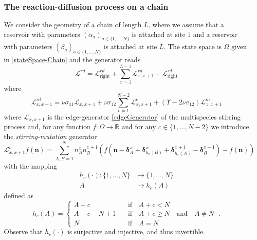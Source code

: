 \documentclass[10pt]{article}
\numberwithin{equation}{section}
\numberwithin{equation}{subsection}
\newcommand{\dt}{\;.}
\begin{document}
\subsubsection{The reaction-diffusion process on a chain}
We consider the geometry of a chain of length $L$, where we assume that a reservoir with parameters $(\alpha_{a})_{a\in\{1,\ldots,N\}}$ is attached at site $1$ and a reservoir with parameters $(\beta_{a})_{a\in\{1,\ldots,N\}}$ is attached at site $L$. The state space is $\Omega$ given in \eqref{stateSpace-Chain} and the generator reads
\begin{equation}\label{RDGenerator}
	\mathcal{L}^{rd}=\mathcal{L}_{\text{right}}^{rd}+\sum_{x=1}^{L-1}\mathcal{L}_{x,x+1}^{rd}+\mathcal{L}_{\text{right}}^{rd}
\end{equation}
where
\begin{equation}\label{edgeGeneratorRD}
	\mathcal{L}_{x,x+1}^{rd}=\nu \sigma_{11}\mathcal{L}_{x,x+1}+\nu \sigma_{12}\sum_{c=1}^{N-2}\mathcal{L}_{x,x+1}^{c}+(\Upsilon-2\nu\sigma_{12})\mathcal{L}_{x,x+1}^{m}
\end{equation}
where $\mathcal{L}_{x,x+1}$ is the edge-generator \eqref{edgeGenerator} of the multispecies stirring process and, for any function $f:\Omega\to \mathbb{R}$ and for any $c\in \{1,\ldots,N-2\}$ we introduce the \textit{stirring-mutation} generator
\begin{equation}
	\mathcal{L}_{x,x+1}^{c}f(\bm{n})=\sum_{A,B=1}^{N}n_{A}^{x}n_{B}^{x+1}\left(f(\bm{n}-\bm{\delta}_{A}^{x}+\bm{\delta}_{h_{c}(B)}^{x}+\bm{\delta}_{h_{c}(A)}^{x+1}-\bm{\delta}_{B}^{x+1})-f(\bm{n})\right)
\end{equation}
with the mapping 
\begin{equation}
	\begin{split}
		h_{c}(\cdot):\{1,\ldots,N\}&\to\{1,\ldots,N\}\\
		A&\to h_{c}(A)
	\end{split}
\end{equation}
defined as
\begin{equation}
	h_{c}(A)=\begin{cases}
		A+c \quad &\text{if}\quad A+c< N \\
		A+c-N+1\quad &\text{if}\quad A+c\geq N\quad \text{and}\quad A\neq N\\
		N\quad &\text{if}\quad A=N
	\end{cases}\dt
\end{equation}
Observe that $h_{c}(\cdot)$ is surjective and injective, and thus invertible. 
\end{document}
